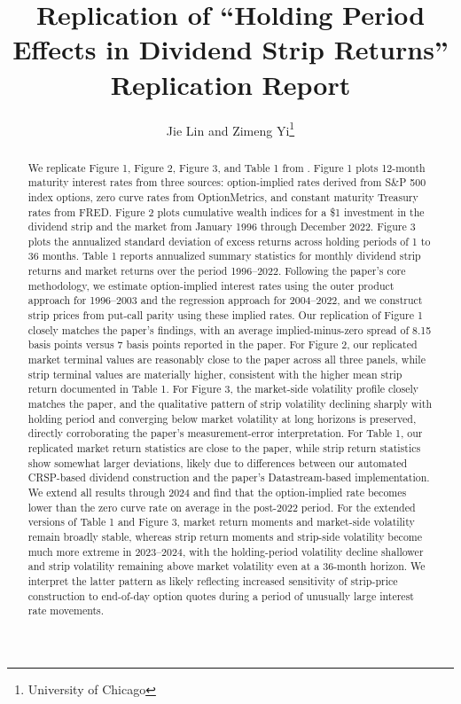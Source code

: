 \documentclass[12pt]{article}
\begin{document}
\title{
Replication of ``Holding Period Effects in Dividend Strip Returns''
\\{\color{blue} \large Replication Report}
}

\author{
Jie Lin and Zimeng Yi\footnote{University of Chicago}
}

\begin{titlepage}
\maketitle

\doublespacing
\begin{abstract}
We replicate Figure 1, Figure 2, Figure 3, and Table 1 from \cite{golez2024holding}.
Figure 1 plots 12-month maturity interest rates from three sources:
option-implied rates derived from S\&P 500 index options,
zero curve rates from OptionMetrics, and constant maturity Treasury rates from FRED.
Figure 2 plots cumulative wealth indices for a \$1 investment in the dividend strip
and the market from January 1996 through December 2022.
Figure 3 plots the annualized standard deviation of excess returns
across holding periods of 1 to 36 months.
Table 1 reports annualized summary statistics for monthly dividend strip returns
and market returns over the period 1996--2022.
Following the paper's core methodology, we estimate option-implied interest rates
using the outer product approach for 1996--2003 and the regression approach for 2004--2022,
and we construct strip prices from put-call parity using these implied rates.
Our replication of Figure 1 closely matches the paper's findings,
with an average implied-minus-zero spread of 8.15 basis points
versus 7 basis points reported in the paper.
For Figure 2, our replicated market terminal values are reasonably close to the paper
across all three panels, while strip terminal values are materially higher,
consistent with the higher mean strip return documented in Table 1.
For Figure 3, the market-side volatility profile closely matches the paper,
and the qualitative pattern of strip volatility declining sharply with holding period
and converging below market volatility at long horizons is preserved,
directly corroborating the paper's measurement-error interpretation.
For Table 1, our replicated market return statistics are close to the paper,
while strip return statistics show somewhat larger deviations,
likely due to differences between our automated CRSP-based dividend construction
and the paper's Datastream-based implementation.
We extend all results through 2024 and find that the option-implied rate
becomes lower than the zero curve rate on average in the post-2022 period.
For the extended versions of Table 1 and Figure 3, market return moments
and market-side volatility remain broadly stable,
whereas strip return moments and strip-side volatility become much more extreme
in 2023--2024, with the holding-period volatility decline shallower and
strip volatility remaining above market volatility even at a 36-month horizon.
We interpret the latter pattern as likely reflecting increased sensitivity
of strip-price construction to end-of-day option quotes during a period
of unusually large interest rate movements.
\end{abstract}


\end{titlepage}
\end{document}
